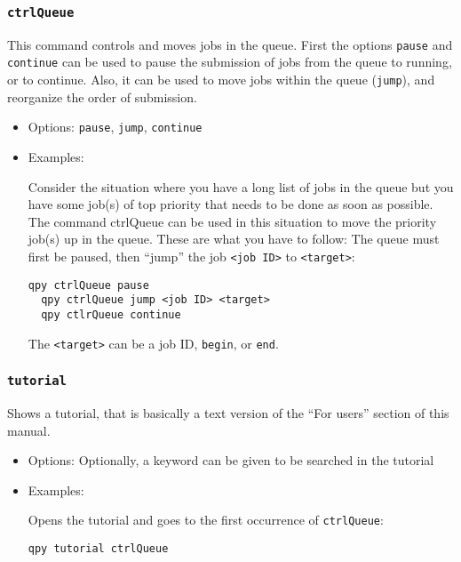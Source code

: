 \documentclass[a4paper,12pt]{article}
\begin{document}
\subsubsection{\texttt{ctrlQueue}}

This command controls and moves jobs in the queue.
First the options \texttt{pause} and \texttt{continue} can be used to pause the submission of jobs from the queue to running, or to continue.
Also, it can be used to move jobs within the queue (\texttt{jump}), and reorganize the order of submission.

\begin{itemize}

\item Options: \texttt{pause}, \texttt{jump}, \texttt{continue}

\item Examples:

Consider the situation where you have a long list of jobs in the queue but you have some job(s) of top priority that needs to be done as soon as possible.
The command ctrlQueue can be used in this situation to move the priority job(s) up in the queue.
These are what you have to follow:
The queue must first be paused, then ``jump'' the job \texttt{<job ID>} to \texttt{<target>}:

\begin{lstlisting}[style=BashStyle]
  qpy ctrlQueue pause
  qpy ctrlQueue jump <job ID> <target>
  qpy ctlrQueue continue
\end{lstlisting}

The \texttt{<target>} can be a job ID, \texttt{begin}, or \texttt{end}.

\end{itemize}

\subsubsection{\texttt{tutorial}}

Shows a tutorial, that is basically a text version of the ``For users'' section of this manual.

\begin{itemize}
\item Options: Optionally, a keyword can be given to be searched in the tutorial

\item Examples:

  Opens the tutorial and goes to the first occurrence of \texttt{ctrlQueue}:
  
  \begin{lstlisting}[style=BashStyle]
    qpy tutorial ctrlQueue
  \end{lstlisting}

\end{itemize}
\end{document}
